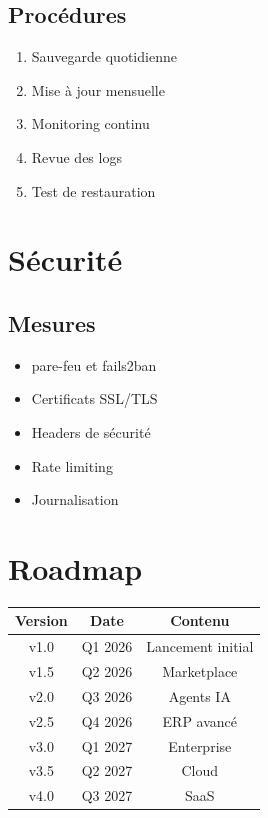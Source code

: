 \documentclass[12pt,a4paper,oneside]{book}
\begin{document}
\section{Procédures}
\begin{enumerate}
\item Sauvegarde quotidienne
\item Mise à jour mensuelle
\item Monitoring continu
\item Revue des logs
\item Test de restauration
\end{enumerate}

\chapter{Sécurité}

\section{Mesures}
\begin{itemize}
\item pare-feu et fails2ban
\item Certificats SSL/TLS
\item Headers de sécurité
\item Rate limiting
\item Journalisation
\end{itemize}

\chapter{Roadmap}

\bigskip
\begin{center}
\begin{tabular}{|c|c|c|}
\hline
\rowcolor{electronblue}
\color{white}\textbf{Version} & \color{white}\textbf{Date} & \color{white}\textbf{Contenu} \\
\hline
v1.0 & Q1 2026 & Lancement initial \\
\hline
v1.5 & Q2 2026 & Marketplace \\
\hline
v2.0 & Q3 2026 & Agents IA \\
\hline
v2.5 & Q4 2026 & ERP avancé \\
\hline
v3.0 & Q1 2027 & Enterprise \\
\hline
v3.5 & Q2 2027 & Cloud \\
\hline
v4.0 & Q3 2027 & SaaS \\
\hline
\end{tabular}
\end{center}
\end{document}
